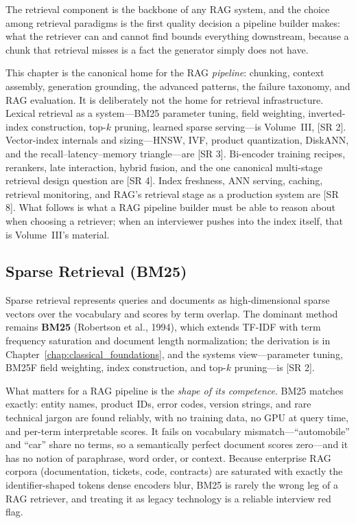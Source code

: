 The retrieval component is the backbone of any RAG system, and the choice
among retrieval paradigms is the first quality decision a pipeline builder
makes: what the retriever can and cannot find bounds everything downstream,
because a chunk that retrieval misses is a fact the generator simply does not have.

\begin{keyinsight}
This chapter is the canonical home for the RAG \emph{pipeline}: chunking,
context assembly, generation grounding, the advanced patterns, the failure
taxonomy, and RAG evaluation.  It is deliberately not the home for retrieval
infrastructure.  Lexical retrieval as a system---BM25 parameter tuning, field
weighting, inverted-index construction, top-$k$ pruning, learned sparse
serving---is Volume~III, [SR 2].  Vector-index internals and sizing---HNSW,
IVF, product quantization, DiskANN, and the recall--latency--memory
triangle---are [SR 3].  Bi-encoder training recipes, rerankers, late
interaction, hybrid fusion, and the one canonical multi-stage retrieval design
question are [SR 4].  Index freshness, ANN serving, caching, retrieval
monitoring, and RAG's retrieval stage as a production system are [SR 8].  What
follows is what a RAG pipeline builder must be able to reason about when
choosing a retriever; when an interviewer pushes into the index itself, that
is Volume~III's material.
\end{keyinsight}

\subsection{Sparse Retrieval (BM25)}

Sparse retrieval represents queries and documents as high-dimensional sparse
vectors over the vocabulary and scores by term overlap.  The dominant method
remains \textbf{BM25} (Robertson et al., 1994), which extends TF-IDF with term
frequency saturation and document length normalization; the derivation is in
Chapter~\ref{chap:classical_foundations}, and the systems view---parameter
tuning, BM25F field weighting, index construction, and top-$k$ pruning---is
[SR 2].

What matters for a RAG pipeline is the \emph{shape of its competence}.  BM25
matches exactly: entity names, product IDs, error codes, version strings, and
rare technical jargon are found reliably, with no training data, no GPU at
query time, and per-term interpretable scores.  It fails on vocabulary
mismatch---``automobile'' and ``car'' share no terms, so a semantically
perfect document scores zero---and it has no notion of paraphrase, word order,
or context.  Because enterprise RAG corpora (documentation, tickets, code,
contracts) are saturated with exactly the identifier-shaped tokens dense
encoders blur, BM25 is rarely the wrong leg of a RAG retriever, and treating
it as legacy technology is a reliable interview red flag.

